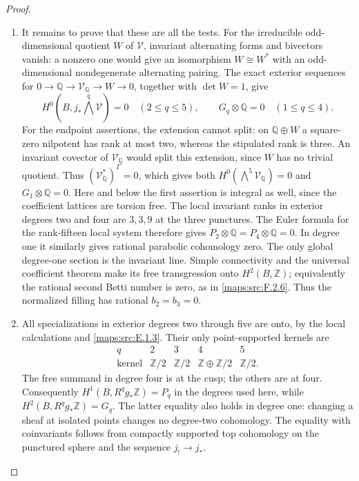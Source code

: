 \begin{proof}
\begin{enumerate}[label=\arabic*.]
\item It remains to prove that these are all the tests.
For the irreducible odd-dimensional quotient $W$
of $\mathcal V$, invariant alternating forms and
bivectors vanish: a nonzero one would give an
isomorphism $W\cong W^*$ with an odd-dimensional
nondegenerate alternating pairing.
The exact exterior sequences for
$0\to\mathbb Q\to\mathcal V_{\mathbb Q}\to W\to0$,
together with $\det W=1$, give
\[
 H^0(B,j_*\bigwedge^q\mathcal V)=0
       \quad(2\le q\le5),\qquad
 G_q\otimes\mathbb Q=0\quad(1\le q\le4).
 \tag{F.HC8}\label{maps:eq:F.HC8}
\]
For the endpoint assertions, the extension cannot split:
on $\mathbb Q\oplus W$ a square-zero nilpotent has rank at
most two, whereas the stipulated rank is three.
An invariant covector of $\mathcal V_{\mathbb Q}$ would
split this extension, since $W$ has no trivial quotient.
Thus $(\mathcal V_{\mathbb Q}^*)^\Gamma=0$, which gives
both $H^0(\bigwedge^5\mathcal V_{\mathbb Q})=0$ and
$G_1\otimes\mathbb Q=0$.
Here and below the first assertion is integral as well,
since the coefficient lattices are torsion free.
The local invariant ranks in exterior degrees two
and four are $3,3,9$ at the three punctures.
The Euler formula for the rank-fifteen local system
therefore gives $P_2\otimes\mathbb Q=P_4\otimes\mathbb Q=0$.
In degree one it similarly gives rational parabolic
cohomology zero.
The only global degree-one section is the invariant
line.  Simple connectivity and the universal
coefficient theorem make its free transgression
onto $H^2(B,\mathbb Z)$; equivalently the rational
second Betti number is zero, as in \ref{maps:src:F.2.6}.
Thus the normalized filling has rational $b_2=b_3=0$.

\item All specializations in exterior degrees two through
five are onto, by the local calculations and \ref{maps:src:E.1.3}.
Their only point-supported kernels are
\[
\begin{array}{c|cccc}
q&2&3&4&5\\ \hline
\text{kernel}&\mathbb Z/2&\mathbb Z/2&
                 \mathbb Z\oplus\mathbb Z/2&\mathbb Z/2 .
\end{array}
\tag{F.HC9}\label{maps:eq:F.HC9}
\]
The free summand in degree four is at the cusp; the
others are at four.
Consequently $H^1(B,R^qg_*\mathbb Z)=P_q$ in the
degrees used here, while
$H^2(B,R^qg_*\mathbb Z)=G_q$.
The latter equality also holds in degree one:
changing a sheaf at isolated points changes no
degree-two cohomology.  The equality with coinvariants
follows from compactly supported top cohomology on
the punctured sphere and the sequence $j_!\to j_*$.


\end{enumerate}
\end{proof}
